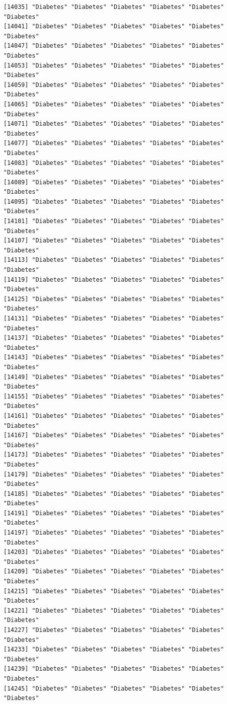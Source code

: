\documentclass[
  letterpaper,
  DIV=11,
  numbers=noendperiod]{scrartcl}
\begin{document}
\begin{verbatim}
[14035] "Diabetes" "Diabetes" "Diabetes" "Diabetes" "Diabetes" "Diabetes"
[14041] "Diabetes" "Diabetes" "Diabetes" "Diabetes" "Diabetes" "Diabetes"
[14047] "Diabetes" "Diabetes" "Diabetes" "Diabetes" "Diabetes" "Diabetes"
[14053] "Diabetes" "Diabetes" "Diabetes" "Diabetes" "Diabetes" "Diabetes"
[14059] "Diabetes" "Diabetes" "Diabetes" "Diabetes" "Diabetes" "Diabetes"
[14065] "Diabetes" "Diabetes" "Diabetes" "Diabetes" "Diabetes" "Diabetes"
[14071] "Diabetes" "Diabetes" "Diabetes" "Diabetes" "Diabetes" "Diabetes"
[14077] "Diabetes" "Diabetes" "Diabetes" "Diabetes" "Diabetes" "Diabetes"
[14083] "Diabetes" "Diabetes" "Diabetes" "Diabetes" "Diabetes" "Diabetes"
[14089] "Diabetes" "Diabetes" "Diabetes" "Diabetes" "Diabetes" "Diabetes"
[14095] "Diabetes" "Diabetes" "Diabetes" "Diabetes" "Diabetes" "Diabetes"
[14101] "Diabetes" "Diabetes" "Diabetes" "Diabetes" "Diabetes" "Diabetes"
[14107] "Diabetes" "Diabetes" "Diabetes" "Diabetes" "Diabetes" "Diabetes"
[14113] "Diabetes" "Diabetes" "Diabetes" "Diabetes" "Diabetes" "Diabetes"
[14119] "Diabetes" "Diabetes" "Diabetes" "Diabetes" "Diabetes" "Diabetes"
[14125] "Diabetes" "Diabetes" "Diabetes" "Diabetes" "Diabetes" "Diabetes"
[14131] "Diabetes" "Diabetes" "Diabetes" "Diabetes" "Diabetes" "Diabetes"
[14137] "Diabetes" "Diabetes" "Diabetes" "Diabetes" "Diabetes" "Diabetes"
[14143] "Diabetes" "Diabetes" "Diabetes" "Diabetes" "Diabetes" "Diabetes"
[14149] "Diabetes" "Diabetes" "Diabetes" "Diabetes" "Diabetes" "Diabetes"
[14155] "Diabetes" "Diabetes" "Diabetes" "Diabetes" "Diabetes" "Diabetes"
[14161] "Diabetes" "Diabetes" "Diabetes" "Diabetes" "Diabetes" "Diabetes"
[14167] "Diabetes" "Diabetes" "Diabetes" "Diabetes" "Diabetes" "Diabetes"
[14173] "Diabetes" "Diabetes" "Diabetes" "Diabetes" "Diabetes" "Diabetes"
[14179] "Diabetes" "Diabetes" "Diabetes" "Diabetes" "Diabetes" "Diabetes"
[14185] "Diabetes" "Diabetes" "Diabetes" "Diabetes" "Diabetes" "Diabetes"
[14191] "Diabetes" "Diabetes" "Diabetes" "Diabetes" "Diabetes" "Diabetes"
[14197] "Diabetes" "Diabetes" "Diabetes" "Diabetes" "Diabetes" "Diabetes"
[14203] "Diabetes" "Diabetes" "Diabetes" "Diabetes" "Diabetes" "Diabetes"
[14209] "Diabetes" "Diabetes" "Diabetes" "Diabetes" "Diabetes" "Diabetes"
[14215] "Diabetes" "Diabetes" "Diabetes" "Diabetes" "Diabetes" "Diabetes"
[14221] "Diabetes" "Diabetes" "Diabetes" "Diabetes" "Diabetes" "Diabetes"
[14227] "Diabetes" "Diabetes" "Diabetes" "Diabetes" "Diabetes" "Diabetes"
[14233] "Diabetes" "Diabetes" "Diabetes" "Diabetes" "Diabetes" "Diabetes"
[14239] "Diabetes" "Diabetes" "Diabetes" "Diabetes" "Diabetes" "Diabetes"
[14245] "Diabetes" "Diabetes" "Diabetes" "Diabetes" "Diabetes" "Diabetes"

\end{verbatim}
\end{document}
